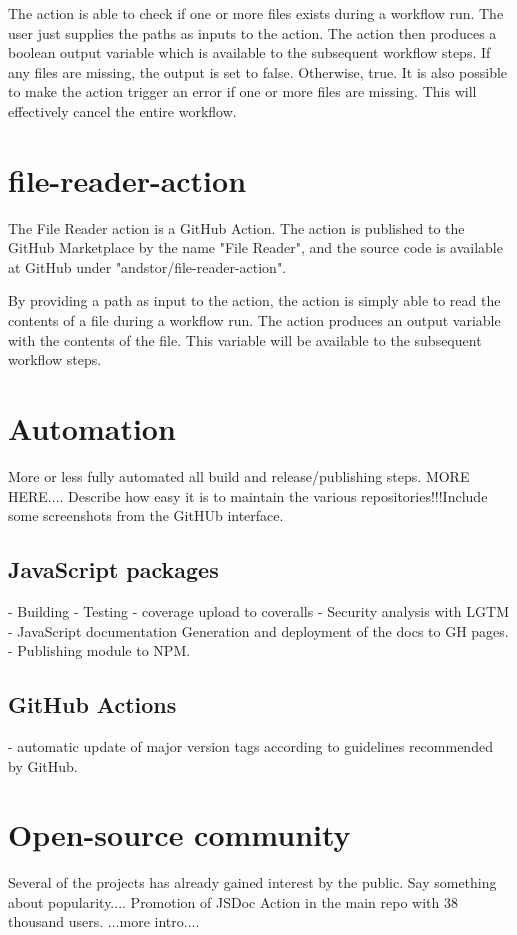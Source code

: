 The action is able to check if one or more files exists during a workflow run. The user just supplies the paths as inputs to the action. The action then produces a boolean output variable which is available to the subsequent workflow steps. If any files are missing, the output is set to false. Otherwise, true. It is also possible to make the action trigger an error if one or more files are missing. This will effectively cancel the entire workflow.

\section{file-reader-action}
The File Reader action is a GitHub Action. The action is published to the GitHub Marketplace by the name "File Reader", and the source code is available at GitHub under "andstor/file-reader-action".

By providing a path as input to the action, the action is simply able to read the contents of a file during a workflow run. The action produces an output variable with the contents of the file. This variable will be available to the subsequent workflow steps.

\section{Automation}
More or less fully automated all build and release/publishing steps.
MORE HERE.... Describe how easy it is to maintain the various repositories!!!Include some screenshots from the GitHUb interface.

\subsection{JavaScript packages}
- Building
- Testing
- coverage upload to coveralls
- Security analysis with LGTM
- JavaScript documentation Generation and deployment of the docs to GH pages.
- Publishing module to NPM.

\subsection{GitHub Actions}
- automatic update of major version tags according to guidelines recommended by GitHub.


\section{Open-source community}
Several of the projects has already gained interest by the public. Say something about popularity....
Promotion of JSDoc Action in the main repo with 38 thousand users. ...more intro....

